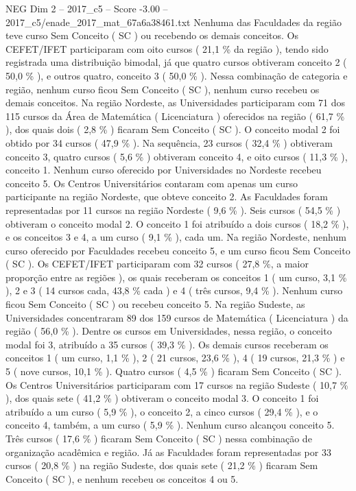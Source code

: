 \begin{textsample}{NEG Dim 2 – 2017\_c5 – Score -3.00 – 2017\_c5/enade\_2017\_mat\_67a6a38461.txt}
Nenhuma das Faculdades da região teve curso Sem Conceito ( SC ) ou recebendo os demais conceitos.
Os CEFET/IFET participaram com oito cursos ( 21,1 \% da região ), tendo sido registrada uma distribuição bimodal, já que quatro cursos obtiveram conceito 2 ( 50,0 \% ), e outros quatro, conceito 3 ( 50,0 \% ).
Nessa combinação de categoria e região, nenhum curso ficou Sem Conceito ( SC ), nenhum curso recebeu os demais conceitos.
Na região Nordeste, as Universidades participaram com 71 dos 115 cursos da Área de Matemática ( Licenciatura ) oferecidos na região ( 61,7 \% ), dos quais dois ( 2,8 \% ) ficaram Sem Conceito ( SC ).
O conceito modal 2 foi obtido por 34 cursos ( 47,9 \% ).
Na sequência, 23 cursos ( 32,4 \% ) obtiveram conceito 3, quatro cursos ( 5,6 \% ) obtiveram conceito 4, e oito cursos ( 11,3 \% ), conceito 1.
Nenhum curso oferecido por Universidades no Nordeste recebeu conceito 5.
Os Centros Universitários contaram com apenas um curso participante na região Nordeste, que obteve conceito 2.
As Faculdades foram representadas por 11 cursos na região Nordeste ( 9,6 \% ).
Seis cursos ( 54,5 \% ) obtiveram o conceito modal 2.
O conceito 1 foi atribuído a dois cursos ( 18,2 \% ), e os conceitos 3 e 4, a um curso ( 9,1 \% ), cada um.
Na região Nordeste, nenhum curso oferecido por Faculdades recebeu conceito 5, e um curso ficou Sem Conceito ( SC ).
Os CEFET/IFET participaram com 32 cursos ( 27,8 \%, a maior proporção entre as regiões ), os quais receberam os conceitos 1 ( um curso, 3,1 \% ), 2 e 3 ( 14 cursos cada, 43,8 \% cada ) e 4 ( três cursos, 9,4 \% ).
Nenhum curso ficou Sem Conceito ( SC ) ou recebeu conceito 5.
Na região Sudeste, as Universidades concentraram 89 dos 159 cursos de Matemática ( Licenciatura ) da região ( 56,0 \% ).
Dentre os cursos em Universidades, nessa região, o conceito modal foi 3, atribuído a 35 cursos ( 39,3 \% ).
Os demais cursos receberam os conceitos 1 ( um curso, 1,1 \% ), 2 ( 21 cursos, 23,6 \% ), 4 ( 19 cursos, 21,3 \% ) e 5 ( nove cursos, 10,1 \% ).
Quatro cursos ( 4,5 \% ) ficaram Sem Conceito ( SC ).
Os Centros Universitários participaram com 17 cursos na região Sudeste ( 10,7 \% ), dos quais sete ( 41,2 \% ) obtiveram o conceito modal 3.
O conceito 1 foi atribuído a um curso ( 5,9 \% ), o conceito 2, a cinco cursos ( 29,4 \% ), e o conceito 4, também, a um curso ( 5,9 \% ).
Nenhum curso alcançou conceito 5.
Três cursos ( 17,6 \% ) ficaram Sem Conceito ( SC ) nessa combinação de organização acadêmica e região.
Já as Faculdades foram representadas por 33 cursos ( 20,8 \% ) na região Sudeste, dos quais sete ( 21,2 \% ) ficaram Sem Conceito ( SC ), e nenhum recebeu os conceitos 4 ou 5.

\end{textsample}
